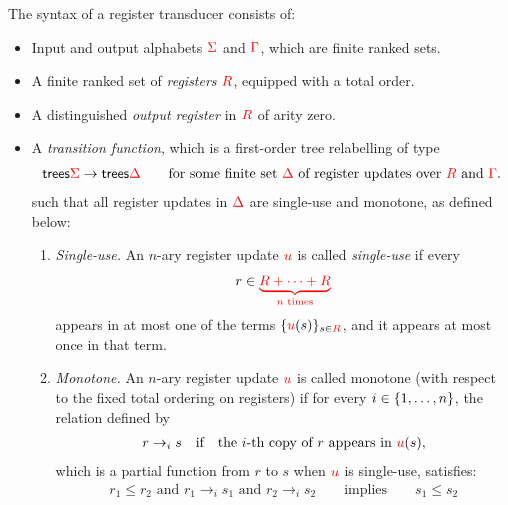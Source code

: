 \begin{definition}\label{def:stt}
The syntax of a register transducer consists of: 
\begin{itemize}
    \item Input and output alphabets ${\color{red}{\Sigma}}$ and ${\color{red}{\Gamma}}$, which are finite ranked sets.
    \item A finite ranked set of \emph{registers} ${{\color{red}{R}}}$, equipped with a total order.
    \item A distinguished \emph{output register} in ${{\color{red}{R}}}$ of arity zero.
    \item A \emph{transition function}, which is a  first-order tree relabelling of type
    \begin{align*}
      \mathsf {trees}{{\color{red}{\Sigma}}} \to \mathsf {trees}{{\color{red}{\Delta}}}  \qquad \text{for some finite set ${\color{red}{\Delta}}$ of  register updates over ${{\color{red}{R}}}$ and ${\color{red}{\Gamma}}$}.
    \end{align*}
    such that all register updates in  ${\color{red}{\Delta}}$ are single-use and monotone, as defined below:
    \begin{enumerate}
        \item \emph{Single-use.}  An $n$-ary register update ${\color{red}{u}}$ is  called  \emph{single-use} if   every
        \begin{align*}
            r \in {\color{red}{\underbrace{{{\color{red}{R}}}+ \cdots + {{\color{red}{R}}}}_{\text{$n$ times}}}}
        \end{align*}
        appears in at most one of the terms $\{{\color{red}{u}}(s)\}_{s \in {{\color{red}{R}}}}$, and it appears at most once in that term. 
        \item \emph{Monotone.} An $n$-ary  register update ${\color{red}{u}}$ is called monotone (with respect to the fixed total ordering on registers) if for every $i \in \{1,\ldots,n\}$, the relation defined by
        \begin{align*} 
            r \to_i s \quad \text{if} \quad  \text{the $i$-th copy of $r$ appears in ${\color{red}{u}}(s)$},
        \end{align*}
        which is a partial function from $r$ to $s$ when ${\color{red}{u}}$ is single-use, satisfies:
        \begin{align*}
            r_1 \leq r_2 \text{ and } r_1 \to_i s_1 \text{ and } r_2 \to_i s_2  \qquad \text{implies} \qquad  s_1 \leq s_2
        \end{align*}
    \end{enumerate}
\end{itemize}
\end{definition}

